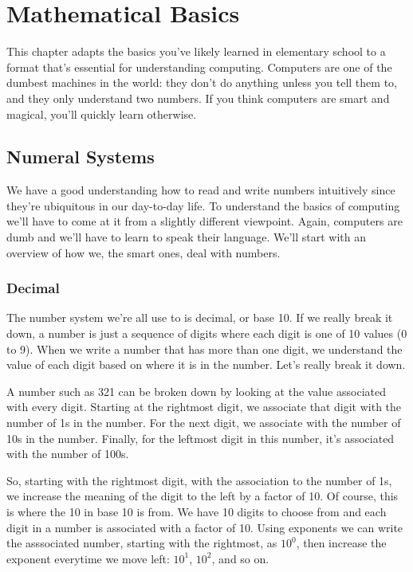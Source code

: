 \chapter{Mathematical Basics}

This chapter adapts the basics you've likely learned in elementary school to a
format that's essential for understanding computing. Computers are one of the
dumbest machines in the world: they don't do anything unless you tell them to,
and they only understand two numbers. If you think computers are smart and
magical, you'll quickly learn otherwise.

\section{Numeral Systems}

We have a good understanding how to read and write numbers intuitively since
they're ubiquitous in our day-to-day life. To understand the basics of computing
we'll have to come at it from a slightly different viewpoint. Again, computers
are dumb and we'll have to learn to speak their language. We'll start with an
overview of how we, the smart ones, deal with numbers.

\subsection{Decimal}

The number system we're all use to is decimal, or base 10. If we really break it
down, a number is just a sequence of digits where each digit is one of 10 values
(0 to 9). When we write a number that has more than one digit, we understand the
value of each digit based on where it is in the number. Let's really break it
down.

A number such as 321 can be broken down by looking at the value associated with
every digit. Starting at the rightmost digit, we associate that digit with the
number of 1s in the number. For the next digit, we associate with the number of
10s in the number. Finally, for the leftmost digit in this number, it's
associated with the number of 100s.

So, starting with the rightmost digit, with the association to the number of 1s,
we increase the meaning of the digit to the left by a factor of 10. Of course,
this is where the 10 in base 10 is from. We have 10 digits to choose from and
each digit in a number is associated with a factor of 10. Using exponents we can
write the asssociated number, starting with the rightmost, as $10^0$, then
increase the exponent everytime we move left: $10^1$, $10^2$, and so on.

